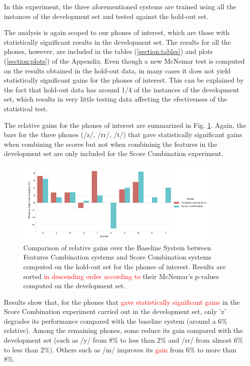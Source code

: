 In this experiment, the three aforementioned systems are trained using all the instances of the
development set and tested against the hold-out set.

The analysis is again scoped to our phones of interest, which are those with statistically
significant results in the development set.
The results for all the phones, however, are included in the tables
(\ref{section:tables}) and plots (\ref{section:plots})
of the Appendix.
Even though a new McNemar test is computed on the
results obtained in the hold-out data, in many cases it does not yield statistically significant gains
for the phones of interest. This can be explained by the fact that hold-out data
has around 1/4 of the instances of the
development set, which results in very little testing data
affecting the efectiveness of the statistical test.

The relative gains for the phones of interest are summarized in Fig. \ref{fig:fusionMcnemarTest}.
Again, the bars for the three phones (/z/, /rr/, /t/) that gave statistically significant
gains when combining the scores but not when combininig the features in the development
set are only included for the Score Combination experiment.

\begin{figure}[H]
	\centering
	\includegraphics[width=0.9\textwidth]{files/figures/results/relatives/relative-fusion-systems-heldout-mcnemar.png}
	\caption{Comparison of relative gains over the Baseline System
	between Features Combination systems and Score Combination
	systems computed on the hold-out set for the phones of interest.
	Results are sorted
	\textcolor{red}{in descending order according to} their McNemar's p-values computed on the development set.}
	\label{fig:fusionMcnemarTest}
\end{figure}

Results show that, for the phones that \textcolor{red}{gave statistically significant gains}
in the Score Combination
experiment carried out in the development set, only 'z' degrades its performance compared
with the baseline system (around a 6\% relative). Among the
remaining phones, some reduce its gain compared with the development set (such as
/y/ from 8\% to less than 2\% and /rr/ from almost 6\% to less than 2\%). Others such
as /m/ improves its \textcolor{red}{gain} from 6\% to more than 8\%.

